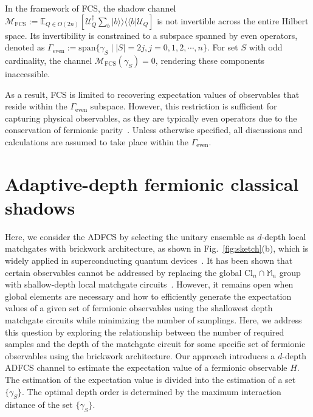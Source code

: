 \documentclass[showpacs,onecolumn,aps,prx,long bibliography,superscriptaddress,notitlepage]{revtex4-1}
\newcommand{\supket}[1]{|#1 \rangle\rangle}
\newcommand{\supbra}[1]{\langle\langle #1 |}
\newcommand{\sbra}[1]{\left[ #1 \right]}
\newcommand{\Ucal}{\mathcal{U}}
\newcommand{\Mbb}{\mathbb{M}}
\newcommand{\Ebb}{\mathbb{E}}
\begin{document}
In the framework of FCS, the shadow channel $\mathcal{M}_{\text{FCS}}:=\Ebb_{Q\in O(2n)}\sbra{\Ucal_{Q}^{\dagger}\sum_{b} \supket{b}\supbra{b} \Ucal_Q}$
is not invertible across the entire Hilbert space.  Its invertibility is constrained to a subspace spanned by even operators, denoted as
$ \Gamma_{\text{even}} := \mathrm{span}\{ \gamma_S \mid |S| = 2j, j=0,1,2,\cdots, n\}.$
For set $S$ with odd cardinality, the channel $\mathcal{M}_{\text{FCS}}(\gamma_S) = 0$, rendering these components inaccessible.


As a result, FCS is limited to recovering expectation values of observables that reside within the $\Gamma_{\text{even}}$ subspace. However, this restriction is sufficient for capturing physical observables, as they are typically even operators due to the conservation of fermionic parity~\cite{turner2011topological}. Unless otherwise specified, all discussions and calculations are assumed to take place within the $\Gamma_{\text{even}}$.



\section{Adaptive-depth fermionic classical shadows}

Here, we consider the ADFCS by selecting the unitary ensemble as $d$-depth local matchgates with brickwork architecture, as shown in Fig.~\ref{fig:sketch}(b), which is widely applied in superconducting quantum devices~\cite{arute2019quantum}. 
It has been shown that certain observables cannot be addressed by replacing the global Cl$_n \cap \Mbb_n$ group with shallow-depth local matchgate circuits~\cite{Zhao21Fermionic}. However, it remains open when global elements are necessary and how to efficiently generate the expectation values of a given set of fermionic observables using the shallowest depth matchgate circuits while minimizing the number of samplings. 
Here, we address this question by exploring the relationship between the number of required samples and the depth of the matchgate circuit for some specific set of fermionic observables using the brickwork architecture. 
{Our approach introduces a $d$-depth ADFCS channel to estimate the expectation value of a fermionic observable $H$. The estimation of the expectation value is divided into the estimation of a set $\{\gamma_S\}$. The optimal depth order is determined by the maximum interaction distance of the set $\{\gamma_S\}$. }
\end{document}
